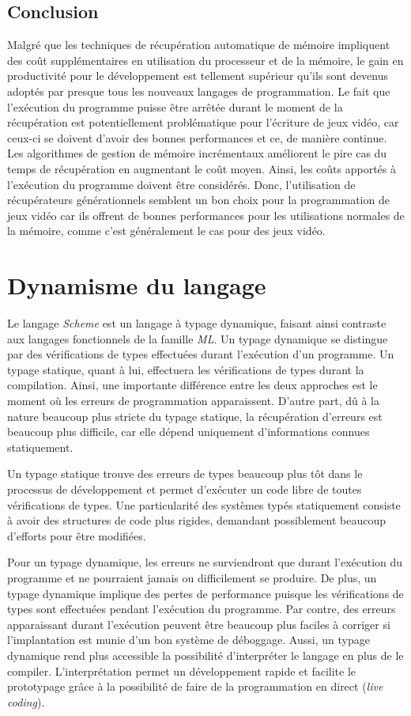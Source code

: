 \documentclass[12pt,twoside,letterpaper,francais]{book}
\newcommand{\Schemelang}{{\textit{Scheme }}}
\begin{document}
\subsection{Conclusion}
Malgré que les techniques de récupération automatique de mémoire
impliquent des coût supplémentaires en utilisation du processeur et de
la mémoire, le gain en productivité pour le développement est
tellement supérieur qu'ils sont devenus adoptés par presque tous les
nouveaux langages de programmation. Le fait que l'exécution du
programme puisse être arrêtée durant le moment de la récupération est
potentiellement problématique pour l'écriture de jeux vidéo, car
ceux-ci se doivent d'avoir des bonnes performances et ce, de manière
continue. Les algorithmes de gestion de mémoire incrémentaux
améliorent le pire cas du temps de récupération en augmentant le coût
moyen. Ainsi, les coûts apportés à l'exécution du programme doivent
être considérés. Donc, l'utilisation de récupérateurs générationnels
semblent un bon choix pour la programmation de jeux vidéo car ils
offrent de bonnes performances pour les utilisations normales de la
mémoire, comme c'est généralement le cas pour des jeux vidéo.


\FloatBarrier
\section{Dynamisme du langage}
Le langage \Schemelang est un langage à typage dynamique, faisant
ainsi contraste aux langages fonctionnels de la famille
\textit{ML}. Un typage dynamique se distingue par des vérifications de
types effectuées durant l'exécution d'un programme. Un typage
statique, quant à lui, effectuera les vérifications de types durant la
compilation. Ainsi, une importante différence entre les deux approches
est le moment où les erreurs de programmation apparaissent. D'autre
part, dû à la nature beaucoup plus stricte du typage statique, la
récupération d'erreurs est beaucoup plus difficile, car elle dépend
uniquement d'informations connues statiquement. 

Un typage statique trouve des erreurs de types beaucoup plus tôt dans
le processus de développement et permet d'exécuter un code libre de
toutes vérifications de types. Une particularité des systèmes typés
statiquement consiste à avoir des structures de code plus rigides,
demandant possiblement beaucoup d'efforts pour être modifiées.

Pour un typage dynamique, les erreurs ne surviendront que durant
l'exécution du programme et ne pourraient jamais ou difficilement se
produire. De plus, un typage dynamique implique des pertes de
performance puisque les vérifications de types sont effectuées pendant
l'exécution du programme. Par contre, des erreurs apparaissant durant
l'exécution peuvent être beaucoup plus faciles à corriger si
l'implantation est munie d'un bon système de déboggage. Aussi, un
typage dynamique rend plus accessible la possibilité d'interpréter le
langage en plus de le compiler. L'interprétation permet un
développement rapide et facilite le prototypage grâce à la possibilité
de faire de la programmation en direct (\textit{live coding}).
\end{document}
